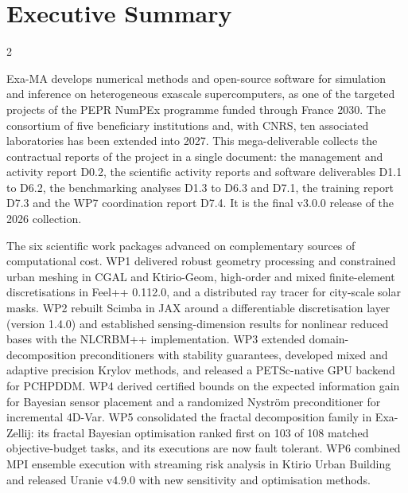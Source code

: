 \clearpage
\section*{Executive Summary}
\label{sec:summary}

\begingroup
\small
\setlength{\parskip}{0.4em}
\begin{multicols}{2}

Exa-MA develops numerical methods and open-source software for
simulation and inference on heterogeneous exascale supercomputers, as
one of the targeted projects of the PEPR NumPEx programme funded
through France 2030. The consortium of five beneficiary institutions
and, with CNRS, ten associated laboratories has been extended into
2027. This mega-deliverable collects the contractual reports of the
project in a single document: the management and activity report
D0.2, the scientific activity reports and software deliverables D1.1
to D6.2, the benchmarking analyses D1.3 to D6.3 and D7.1, the
training report D7.3 and the WP7 coordination report D7.4. It is the
final v3.0.0 release of the 2026 collection.

The six scientific work packages advanced on complementary sources of
computational cost. WP1 delivered robust geometry processing and
constrained urban meshing in CGAL and Ktirio-Geom, high-order and
mixed finite-element discretisations in Feel++ 0.112.0, and a
distributed ray tracer for city-scale solar masks. WP2 rebuilt Scimba
in JAX around a differentiable discretisation layer (version 1.4.0)
and established sensing-dimension results for nonlinear reduced bases
with the NLCRBM++ implementation. WP3 extended domain-decomposition
preconditioners with stability guarantees, developed mixed and
adaptive precision Krylov methods, and released a PETSc-native GPU
backend for PCHPDDM. WP4 derived certified bounds on the expected
information gain for Bayesian sensor placement and a randomized
Nyström preconditioner for incremental 4D-Var. WP5 consolidated the
fractal decomposition family in Exa-Zellij: its fractal Bayesian
optimisation ranked first on 103 of 108 matched objective-budget
tasks, and its executions are now fault tolerant. WP6 combined MPI
ensemble execution with streaming risk analysis in Ktirio Urban
Building and released Uranie v4.9.0 with new sensitivity and
optimisation methods.


\end{multicols}

